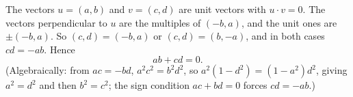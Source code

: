 The vectors $u=(a,b)$ and $v=(c,d)$ are unit vectors with $u\cdot v=0$. The vectors perpendicular to $u$ are the multiples of $(-b,a)$, and the unit ones are $\pm(-b,a)$. So $(c,d)=(-b,a)$ or $(c,d)=(b,-a)$, and in both cases $cd=-ab$. Hence
\[
ab+cd=\boxed{0}.
\]
(Algebraically: from $ac=-bd$, $a^2c^2=b^2d^2$, so $a^2(1-d^2)=(1-a^2)d^2$, giving $a^2=d^2$ and then $b^2=c^2$; the sign condition $ac+bd=0$ forces $cd=-ab$.)
